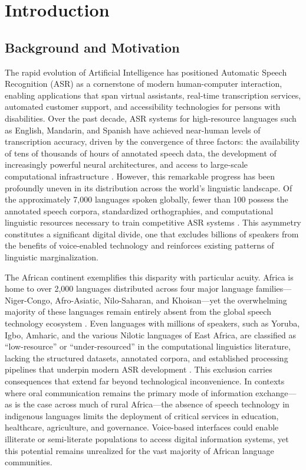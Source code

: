 \documentclass[12pt,a4paper]{article}
\begin{document}
\section*{Introduction}

\subsection{Background and Motivation}

The rapid evolution of Artificial Intelligence has positioned Automatic Speech Recognition (ASR) as a cornerstone of modern human-computer interaction, enabling applications that span virtual assistants, real-time transcription services, automated customer support, and accessibility technologies for persons with disabilities. Over the past decade, ASR systems for high-resource languages such as English, Mandarin, and Spanish have achieved near-human levels of transcription accuracy, driven by the convergence of three factors: the availability of tens of thousands of hours of annotated speech data, the development of increasingly powerful neural architectures, and access to large-scale computational infrastructure \citep{baevski2020wav2vec, radford2023robust}. However, this remarkable progress has been profoundly uneven in its distribution across the world's linguistic landscape. Of the approximately 7,000 languages spoken globally, fewer than 100 possess the annotated speech corpora, standardized orthographies, and computational linguistic resources necessary to train competitive ASR systems \citep{joshi2020state}. This asymmetry constitutes a significant digital divide, one that excludes billions of speakers from the benefits of voice-enabled technology and reinforces existing patterns of linguistic marginalization.

The African continent exemplifies this disparity with particular acuity. Africa is home to over 2,000 languages distributed across four major language families---Niger-Congo, Afro-Asiatic, Nilo-Saharan, and Khoisan---yet the overwhelming majority of these languages remain entirely absent from the global speech technology ecosystem \citep{adelani2022masakhaner}. Even languages with millions of speakers, such as Yoruba, Igbo, Amharic, and the various Nilotic languages of East Africa, are classified as ``low-resource'' or ``under-resourced'' in the computational linguistics literature, lacking the structured datasets, annotated corpora, and established processing pipelines that underpin modern ASR development \citep{magueresse2020low}. This exclusion carries consequences that extend far beyond technological inconvenience. In contexts where oral communication remains the primary mode of information exchange---as is the case across much of rural Africa---the absence of speech technology in indigenous languages limits the deployment of critical services in education, healthcare, agriculture, and governance. Voice-based interfaces could enable illiterate or semi-literate populations to access digital information systems, yet this potential remains unrealized for the vast majority of African language communities.
\end{document}

